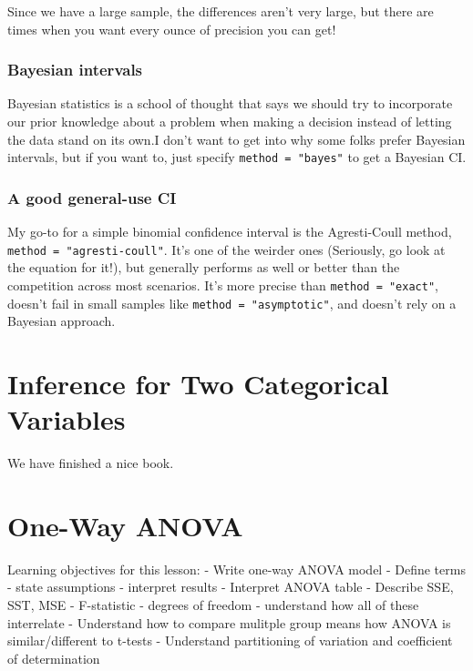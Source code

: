 \documentclass[
]{book}
\theoremstyle{definition}
\theoremstyle{definition}
\theoremstyle{definition}
\theoremstyle{remark}
\begin{document}
Since we have a large sample, the differences aren't very large, but there are times when you want every ounce of precision you can get!

\hypertarget{bayesian-intervals}{%
\subsection{Bayesian intervals}\label{bayesian-intervals}}

Bayesian statistics is a school of thought that says we should try to incorporate our prior knowledge about a problem when making a decision instead of letting the data stand on its own.I don't want to get into why some folks prefer Bayesian intervals, but if you want to, just specify \texttt{method\ =\ "bayes"} to get a Bayesian CI.

\hypertarget{a-good-general-use-ci}{%
\subsection{A good general-use CI}\label{a-good-general-use-ci}}

My go-to for a simple binomial confidence interval is the Agresti-Coull method, \texttt{method\ =\ "agresti-coull"}. It's one of the weirder ones (Seriously, go look at the equation for it!), but generally performs as well or better than the competition across most scenarios. It's more precise than \texttt{method\ =\ "exact"}, doesn't fail in small samples like \texttt{method\ =\ "asymptotic"}, and doesn't rely on a Bayesian approach.

\hypertarget{twocategorical}{%
\chapter{Inference for Two Categorical Variables}\label{twocategorical}}

We have finished a nice book.

\hypertarget{anova}{%
\chapter{One-Way ANOVA}\label{anova}}

Learning objectives for this lesson:
- Write one-way ANOVA model
- Define terms
- state assumptions
- interpret results
- Interpret ANOVA table
- Describe SSE, SST, MSE
- F-statistic
- degrees of freedom
- understand how all of these interrelate
- Understand how to compare mulitple group means how ANOVA is similar/different to t-tests
- Understand partitioning of variation and coefficient of determination
\end{document}
